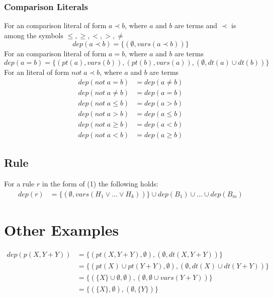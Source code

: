 \documentclass{article}
\newcommand{\set}[1]{\{#1\}}
\newcommand{\dep}[2]{\{(#1), (#2)\}}
\begin{document}
	\subsubsection{Comparison Literals}
	For an comparison literal of form $a \prec b$, where $a$ and $b$ are terms and $\prec$ is among the symbols $\leq,\ge,<,>,\neq$
	\begin{equation*}
		dep(a \prec b) = \set{(\emptyset, vars(a \prec b))}
	\end{equation*}
	For an comparison literal of form $a = b$, where $a$ and $b$ are terms
	\begin{equation*}
		dep(a = b) = \set{(pt(a), vars(b)), (pt(b), vars(a)), (\emptyset, dt(a) \cup dt(b))}
	\end{equation*}
	For an literal of form $not \; a \prec b$, where $a$ and $b$ are terms
	\begin{align*}
		dep(not \; a = b) &= dep(a \neq b) \\
		dep(not \; a \neq b) &= dep(a = b) \\
		dep(not \; a \leq b) &= dep(a > b) \\
		dep(not \; a > b) &= dep(a \leq b) \\
		dep(not \; a \ge b) &= dep(a < b) \\
		dep(not \; a < b) &= dep(a \ge b)
	\end{align*}


	\subsection{Rule}
	For a rule $r$ in the form of (1) the following holds:
	\begin{align*}
		dep(r) &= \set{(\emptyset, vars(H_1\vee ... \vee H_k))} \cup dep(B_1) \cup ... \cup dep(B_m)
	\end{align*}

	\section{Other Examples}
	\begin{align*}
		dep(p(X,Y+Y)) &= \dep{pt(X,Y+Y), \emptyset}{\emptyset, dt(X,Y+Y)}
		\\ &= \dep{pt(X) \cup pt(Y+Y), \emptyset}{\emptyset, dt(X) \cup dt(Y+Y)}
		\\ &= \dep{\set{X} \cup \emptyset, \emptyset}{\emptyset, \emptyset \cup vars(Y+Y)}
		\\ &= \dep{\set{X}, \emptyset}{\emptyset, \set{Y}}
	\end{align*}
\end{document}
